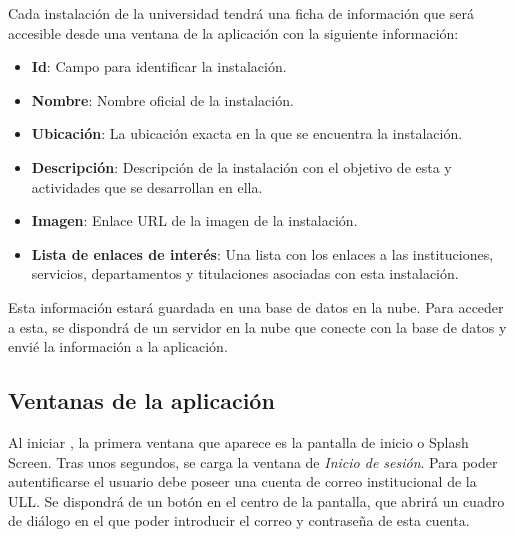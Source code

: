 Cada instalación de la universidad tendrá una ficha de información que será accesible desde una ventana de la aplicación con la siguiente información:

\begin{itemize}
    \item \textbf{Id}: Campo para identificar la instalación.
    \item \textbf{Nombre}: Nombre oficial de la instalación.
    \item \textbf{Ubicación}: La ubicación exacta en la que se encuentra la instalación. 
    \item \textbf{Descripción}: Descripción de la instalación con el objetivo de esta y actividades que se desarrollan en ella.
    \item \textbf{Imagen}: Enlace URL de la imagen de la instalación.
    \item \textbf{Lista de enlaces de interés}: Una lista con los enlaces a las instituciones, servicios, departamentos y titulaciones asociadas con esta instalación.
\end{itemize}

Esta información estará guardada en una base de datos en la nube. Para acceder a esta, se dispondrá de un servidor en la nube que conecte con la base de datos y envié la información a la aplicación.

\subsection{Ventanas de la aplicación}

 

  
Al iniciar \ULLAR{}, la primera ventana que aparece es la pantalla de inicio o Splash Screen. Tras unos segundos, se carga la ventana de \textit{Inicio de sesión}. Para poder autentificarse el usuario debe poseer una cuenta de correo institucional de la ULL. Se dispondrá de un botón en el centro de la pantalla, que abrirá un cuadro de diálogo en el que poder introducir el correo y contraseña de esta cuenta.
  

